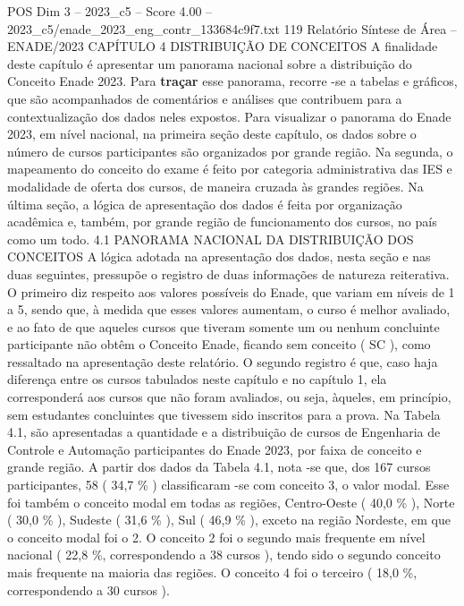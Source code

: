 \begin{textsample}{POS Dim 3 – 2023\_c5 – Score 4.00 – 2023\_c5/enade\_2023\_eng\_contr\_133684c9f7.txt}  \label{ex:f3_pos_058}
119 Relatório Síntese de Área – ENADE/2023 CAPÍTULO 4 DISTRIBUIÇÃO DE CONCEITOS A finalidade deste capítulo é apresentar um panorama nacional sobre a distribuição do Conceito Enade 2023.
Para \textbf{traçar} esse panorama, recorre -se a tabelas e gráficos, que são acompanhados de comentários e análises que contribuem para a contextualização dos dados neles expostos.
Para visualizar o panorama do Enade 2023, em nível nacional, na primeira seção deste capítulo, os dados sobre o número de cursos participantes são organizados por grande região.
Na segunda, o mapeamento do conceito do exame é feito por categoria administrativa das IES e modalidade de oferta dos cursos, de maneira cruzada às grandes regiões.
Na última seção, a lógica de apresentação dos dados é feita por organização acadêmica e, também, por grande região de funcionamento dos cursos, no país como um todo. 4.1 PANORAMA NACIONAL DA DISTRIBUIÇÃO DOS CONCEITOS A lógica adotada na apresentação dos dados, nesta seção e nas duas seguintes, pressupõe o registro de duas informações de natureza reiterativa.
O primeiro diz respeito aos valores possíveis do Enade, que variam em níveis de 1 a 5, sendo que, à medida que esses valores aumentam, o curso é melhor avaliado, e ao fato de que aqueles cursos que tiveram somente um ou nenhum concluinte participante não obtêm o Conceito Enade, ficando sem conceito ( SC ), como ressaltado na apresentação deste relatório.
O segundo registro é que, caso haja diferença entre os cursos tabulados neste capítulo e no capítulo 1, ela corresponderá aos cursos que não foram avaliados, ou seja, àqueles, em princípio, sem estudantes concluintes que tivessem sido inscritos para a prova.
Na Tabela 4.1, são apresentadas a quantidade e a distribuição de cursos de Engenharia de Controle e Automação participantes do Enade 2023, por faixa de conceito e grande região.
A partir dos dados da Tabela 4.1, nota -se que, dos 167 cursos participantes, 58 ( 34,7 \% ) classificaram -se com conceito 3, o valor modal.
Esse foi também o conceito modal em todas as regiões, Centro-Oeste ( 40,0 \% ), Norte ( 30,0 \% ), Sudeste ( 31,6 \% ), Sul ( 46,9 \% ), exceto na região Nordeste, em que o conceito modal foi o 2.
O conceito 2 foi o segundo mais frequente em nível nacional ( 22,8 \%, correspondendo a 38 cursos ), tendo sido o segundo conceito mais frequente na maioria das regiões.
O conceito 4 foi o terceiro ( 18,0 \%, correspondendo a 30 cursos ).

\end{textsample}
